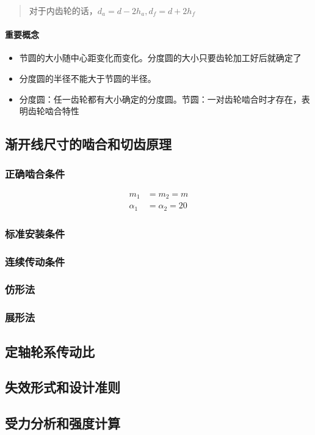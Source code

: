 \documentclass[twocolumn]{ctexart}
\begin{document}
\begin{quote}
{\qquad{}\ccwd\kaishu{}
对于内齿轮的话，$d_a=d-2h_a,d_f=d+2h_f$
}
\end{quote}
\paragraph{重要概念}
\begin{itemize}
\item 节圆的大小随中心距变化而变化。分度圆的大小只要齿轮加工好后就确定了
\item 分度圆的半径不能大于节圆的半径。
\item 分度圆：任一齿轮都有大小确定的分度圆。节圆：一对齿轮啮合时才存在，表明齿轮啮合特性
\end{itemize}

\subsection{渐开线尺寸的啮合和切齿原理}
\subsubsection{正确啮合条件}
\begin{align*}
  m_1&=m_2=m\\
\alpha_1&=\alpha_2=20
\end{align*}
\subsubsection{标准安装条件}
\subsubsection{连续传动条件}
\subsubsection{仿形法}
\subsubsection{展形法}

\subsection{定轴轮系传动比}
\subsection{失效形式和设计准则} 
\subsection{受力分析和强度计算}
\end{document}
